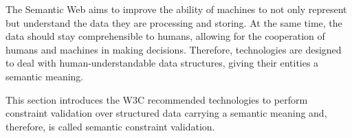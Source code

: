 The Semantic Web aims to improve the ability of machines to not only represent but understand the data they are processing and storing. At the same time, the data should stay comprehensible to humans, allowing for the cooperation of humans and machines in making decisions. Therefore, technologies are designed to deal with human-understandable data structures, giving their entities a semantic meaning. \cite{berners2002new} 
 
 This section introduces the W3C recommended technologies to perform constraint validation over structured data carrying a semantic meaning and, therefore, is called semantic constraint validation.